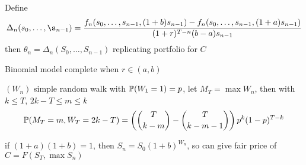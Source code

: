 \begin{prop}
    Define
    \begin{align*}
        \Delta_n(s_0, \dots, \s_{n-1}) = \frac{f_n(s_0, \dots, s_{n-1}, (1 + b)s_{n-1}) - f_n(s_0, \dots, s_{n-1}, (1 + a)s_{n-1})}{(1+r)^{T-n}(b-a)s_{n-1}}
    \end{align*}
    then $\theta_n = \Delta_n(S_0, \dots, S_{n-1})$ replicating portfolio for $C$
\end{prop}

\begin{fact}
    Binomial model complete when $ r \in (a, b)$
\end{fact}

\begin{prop}
    $(W_n)$ simple random walk with $\mathbb{P}(W_1 = 1) = p$, let $M_T = \max W_n$, then with $k \leq T$, $2k - T \leq m \leq k$
    \begin{align*}
        \mathbb{P}(M_T = m, W_T = 2k - T) = \left( {T \choose k-m} - {T \choose k - m -1} \right)p^k(1-p)^{T-k}
    \end{align*}
\end{prop}

\begin{example}
    if $(1 + a)(1 + b) = 1$, then $S_n = S_0(1 + b)^{W_n}$, so can give fair price of $C = F(S_T, \max S_n)$
\end{example}

